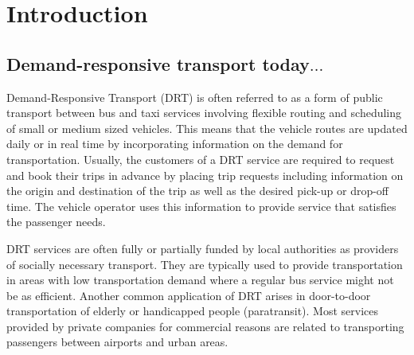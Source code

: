 \documentclass[dissertation,draft*]{aaltoseries}
\begin{document}
\tableofcontents

\listofpublications




\chapter{Introduction}
\section{Demand-responsive transport today$\ldots$}
Demand-Responsive Transport (DRT) is often referred to as a form of public transport between bus and taxi services involving 
flexible routing and scheduling of small or medium sized vehicles. 
This means that 
the vehicle routes are updated daily or in real time by incorporating information on
the demand for transportation. Usually, the customers of a DRT service are required to
request and book their trips in advance by placing trip requests including information
on the origin and destination of the trip as well as the desired pick-up or drop-off time.
The vehicle operator uses this information to provide service that satisfies the passenger needs.


DRT services are often fully or partially funded by local 
authorities as providers of socially necessary transport. 
They are typically used to provide transportation in areas with low 
transportation demand where a regular bus service might not be as efficient. 
Another common application of DRT arises in door-to-door transportation
of elderly or handicapped people (paratransit).
Most services provided by private companies for commercial reasons
are related to transporting passengers between airports and urban areas.
\end{document}
